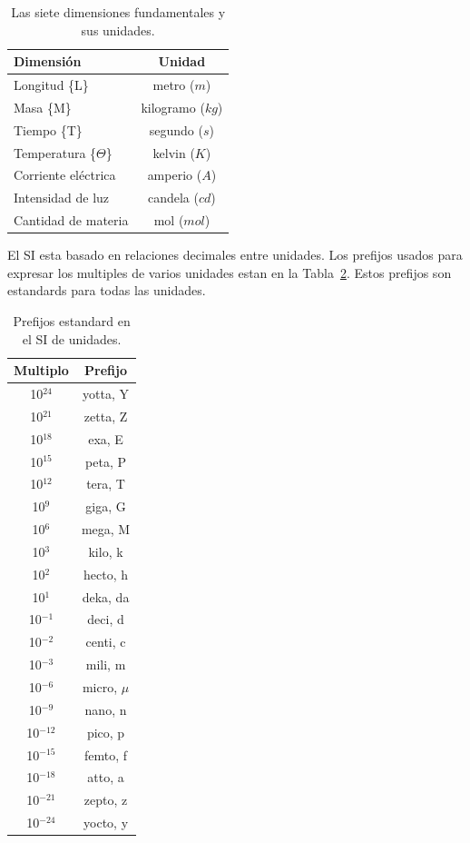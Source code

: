 \documentclass[10pt, oneside]{article}
\begin{document}
\begin{table}[h!]
\centering
\begin{tabular}{l c}
 \hline
 Dimensi\'on & Unidad \\ [0.5ex]
 \hline\hline
 Longitud \{L\} & metro ($m$)  \\
 Masa \{M\} & kilogramo ($kg$)  \\
 Tiempo \{T\} & segundo ($s$)  \\
 Temperatura \{$\Theta$\} & kelvin ($K$)  \\
 Corriente el\'ectrica & amperio ($A$)  \\
 Intensidad de luz &  candela ($cd$) \\ 
 Cantidad de materia & mol ($mol$)  \\ [1ex]
 \hline
\end{tabular}
\caption{Las siete dimensiones fundamentales y sus unidades.}
\label{t1}
\end{table}

El SI esta basado en relaciones decimales entre unidades. Los prefijos usados para expresar los multiples de varios unidades estan en la Tabla~\ref{t1}. Estos prefijos son estandards para todas las unidades.

\begin{table}[h!]
\centering
\begin{tabular}{c c}
 \hline
 Multiplo & Prefijo \\ [0.5ex]
 \hline\hline
 10$^{24}$ & yotta, Y \\
 10$^{21}$ & zetta, Z \\
 10$^{18}$ & exa, E \\
 10$^{15}$ & peta, P \\
 10$^{12}$ & tera, T \\
 10$^{9}$ & giga, G \\
 10$^{6}$ & mega, M \\
 10$^{3}$ & kilo, k \\
 10$^{2}$ & hecto, h \\
 10$^{1}$ & deka, da \\
 10$^{-1}$ & deci, d \\
 10$^{-2}$ & centi, c \\
 10$^{-3}$ & mili, m \\
 10$^{-6}$ & micro, $\mu$ \\
 10$^{-9}$ & nano, n \\
 10$^{-12}$ & pico, p \\
 10$^{-15}$ & femto, f \\
 10$^{-18}$ & atto, a \\
 10$^{-21}$ & zepto, z \\
 10$^{-24}$ & yocto, y \\ [1ex]
  \hline
\end{tabular}
\caption{Prefijos estandard en el SI de unidades.}
\label{t1}
\end{table}
\end{document}
